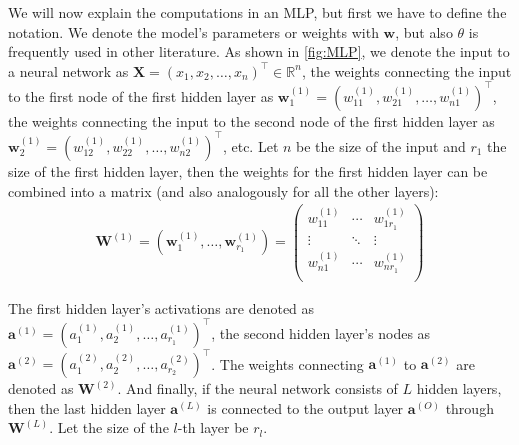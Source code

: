 We will now explain the computations in an MLP, but first we have to define the notation. We denote the model's parameters or weights with $\mathbf{w}$, but also $\theta$ is frequently used in other literature. As shown in \cref{fig:MLP}, we denote the input to a neural network as $\mathbf{X}= \left(x_1, x_2, \dots, x_n \right)^\top \in \mathbb{R}^n$, the weights connecting the input to the first node of the first hidden layer as $\mathbf{w}_1^{(1)} = \left(w_{11}^{(1)}, w_{21}^{(1)}, \dots, w_{n1}^{(1)} \right)^\top$, the weights connecting the input to the second node of the first hidden layer as $\mathbf{w}_2^{(1)} = \left(w_{12}^{(1)}, w_{22}^{(1)}, \dots, w_{n2}^{(1)} \right)^\top$, etc. Let $n$ be the size of the input and $r_1$ the size of the first hidden layer, then the weights for the first hidden layer can be combined into a matrix (and also analogously for all the other layers):
\begin{align}
\mathbf{W}^{(1)} = \left(\mathbf{w}_1^{(1)}, \dots ,\mathbf{w}_{r_1}^{(1)} \right) = \left(
\begin{array}{ccc} 
w_{11}^{(1)} & \cdots & w_{1r_1}^{(1)} \\ 
\vdots & \ddots & \vdots \\ 
w_{n1}^{(1)} & \cdots & w_{nr_1}^{(1)} \\ 
\end{array}
\right)
\end{align}

The first hidden layer's activations are denoted as $\mathbf{a}^{(1)} = \left(a_1^{(1)}, a_2^{(1)}, \dots, a_{r_1}^{(1)}\right)^\top$, the second hidden layer's nodes as $\mathbf{a}^{(2)} = \left(a_1^{(2)}, a_2^{(2)}, \dots, a_{r_2}^{(2)}\right)^\top$. The weights connecting $\mathbf{a}^{(1)}$ to $\mathbf{a}^{(2)}$ are denoted as $\mathbf{W}^{(2)}$. And finally, if the neural network consists of $L$ hidden layers, then the last hidden layer $\mathbf{a}^{(L)}$ is connected to the output layer $\mathbf{a}^{(O)}$ through $\mathbf{W}^{(L)}$. Let the size of the $l$-th layer be $r_l$.

